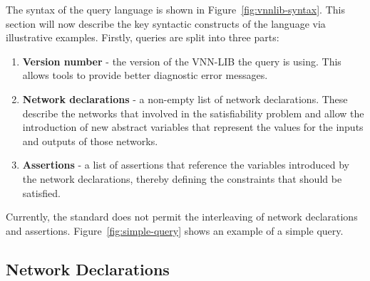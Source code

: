 The syntax of the \vnnlib{} query language is shown in Figure~\ref{fig:vnnlib-syntax}.  This section will now describe the key syntactic constructs of the language via illustrative examples. Firstly, queries are split into three parts: 
\begin{enumerate}
\item \textbf{Version number} - the version of the VNN-LIB the query is using. This allows tools to provide better diagnostic error messages.
\item \textbf{Network declarations} - a non-empty list of network declarations. These describe the networks that involved in the satisfiability problem and allow the introduction of new abstract variables that represent the values for the inputs and outputs of those networks.
\item \textbf{Assertions} - a list of assertions that reference the variables introduced by the network declarations, thereby defining the constraints that should be satisfied.
\end{enumerate}
Currently, the standard does not permit the interleaving of network declarations and assertions. Figure~\ref{fig:simple-query} shows an example of a simple query.


\subsection{Network Declarations}
\label{sec:network-declarations}

